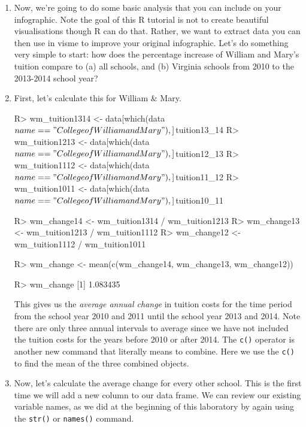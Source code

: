 \documentclass{article}
\newenvironment{Schunk}{}{}
\newcommand{\code}[1]{\texttt{#1}}
\newcommand{\proglang}[1]{\textsf{#1}}
\begin{document}
{\begin{enumerate}[leftmargin=15mm]
\item Now, we're going to do some basic analysis that you can include on your infographic.  Note the goal of this \proglang{R} tutorial is not to create beautiful visualisations though \proglang{R} can do that.  Rather, we want to extract data you can then use in visme to improve your original infographic.  Let's do something very simple to start: how does the percentage increase of William and Mary's tuition compare to (a) all schools, and (b) Virginia schools from 2010 to the 2013-2014 school year?

\item First, let's calculate this for William \& Mary.

\begin{Schunk}
\begin{Sinput}

R> wm_tuition1314 <- data[which(data$name == "College of 
William and Mary"), ]$tuition13_14
R> wm_tuition1213 <- data[which(data$name == "College of 
William and Mary"), ]$tuition12_13
R> wm_tuition1112 <- data[which(data$name == "College of 
William and Mary"), ]$tuition11_12
R> wm_tuition1011 <- data[which(data$name == "College of 
William and Mary"), ]$tuition10_11

R> wm_change14 <- wm_tuition1314 / wm_tuition1213
R> wm_change13 <- wm_tuition1213 / wm_tuition1112
R> wm_change12 <- wm_tuition1112 / wm_tuition1011

R> wm_change <- mean(c(wm_change14, wm_change13, wm_change12))

R> wm_change
[1] 1.083435

\end{Sinput}
\end{Schunk}

This gives us the \textit{average annual change} in tuition costs for the time period from the school year 2010 and 2011 until the school year 2013 and 2014.  Note there are only three annual intervals to average since we have not included the tuition costs for the years before 2010 or after 2014.  The \code{c()} operator is another new command that literally means to combine.  Here we use the \code{c()} to find the mean of the three combined objects.

\item Now, let's calculate the average change for every other school.  This is the first time we will add a new column to our data frame.  We can review our existing variable names, as we did at the beginning of this laboratory by again using the \code{str()} or \code{names()} command.


\end{enumerate}}
\end{document}
